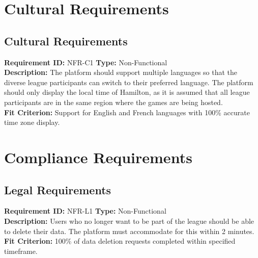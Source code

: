 \documentclass[12pt, titlepage]{article}
\begin{document}
\section{Cultural Requirements}
\subsection{Cultural Requirements}
\textbf{Requirement ID:} NFR-C1 \quad \textbf{Type:} Non-Functional \\
\textbf{Description:} The platform should support multiple languages so that the diverse league participants can switch to their preferred language. The platform should only display the local time of Hamilton, as it is assumed that all league participants are in the same region where the games are being hosted.\\
\textbf{Fit Criterion:} Support for English and French languages with 100\% accurate time zone display.

\section{Compliance Requirements}
\subsection{Legal Requirements}
\textbf{Requirement ID:} NFR-L1 \quad \textbf{Type:} Non-Functional \\
\textbf{Description:} Users who no longer want to be part of the league should be able to delete their data. The platform must accommodate for this within 2 minutes.\\
\textbf{Fit Criterion:} 100\% of data deletion requests completed within specified timeframe.
\end{document}
